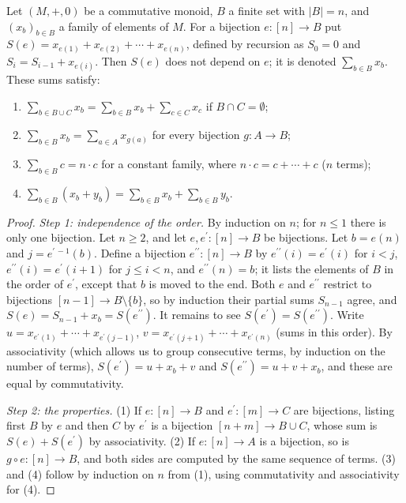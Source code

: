 \begin{lemma}\label{combinatorics:lemma-finite-sums}
Let $(M, +, 0)$ be a commutative monoid, $B$ a finite set with $|B| = n$, and $(x_b)_{b \in B}$ a family of elements of $M$. For a bijection $e \colon [n] \to B$ put
$S(e) = x_{e(1)} + x_{e(2)} + \cdots + x_{e(n)}$, defined by recursion as $S_0 = 0$ and $S_{i} = S_{i-1} + x_{e(i)}$. Then $S(e)$ does not depend on $e$; it is denoted $\sum_{b \in B}x_b$. These sums
satisfy:
\begin{enumerate}
\item $\sum_{b \in B \cup C}x_b = \sum_{b \in B}x_b + \sum_{c \in C}x_c$ if $B \cap C = \emptyset$;
\item $\sum_{b \in B}x_b = \sum_{a \in A}x_{g(a)}$ for every bijection $g \colon A \to B$;
\item $\sum_{b \in B}c = n \cdot c$ for a constant family, where $n \cdot c = c + \cdots + c$ ($n$ terms);
\item $\sum_{b \in B}(x_b + y_b) = \sum_{b \in B}x_b + \sum_{b \in B}y_b$.
\end{enumerate}
\end{lemma}

\begin{proof}
\emph{Step 1: independence of the order.} By induction on $n$; for $n \leq 1$ there is only one bijection. Let $n \geq 2$, and let $e, e^{\prime} \colon [n] \to B$ be bijections. Let
$b = e(n)$ and $j = e^{\prime\,-1}(b)$. Define a bijection $e^{\prime\prime} \colon [n] \to B$ by $e^{\prime\prime}(i) = e^{\prime}(i)$ for $i < j$, $e^{\prime\prime}(i) = e^{\prime}(i + 1)$ for
$j \leq i < n$, and $e^{\prime\prime}(n) = b$; it lists the elements of $B$ in the order of $e^{\prime}$, except that $b$ is moved to the end. Both $e$ and $e^{\prime\prime}$ restrict to bijections
$[n - 1] \to B \setminus \{b\}$, so by induction their partial sums $S_{n-1}$ agree, and $S(e) = S_{n-1} + x_b = S(e^{\prime\prime})$. It remains to see $S(e^{\prime}) = S(e^{\prime\prime})$.
Write $u = x_{e^{\prime}(1)} + \cdots + x_{e^{\prime}(j-1)}$, $v = x_{e^{\prime}(j+1)} + \cdots + x_{e^{\prime}(n)}$ (sums in this order). By associativity (which allows us to group consecutive terms,
by induction on the number of terms), $S(e^{\prime}) = u + x_b + v$ and $S(e^{\prime\prime}) = u + v + x_b$, and these are equal by commutativity.

\emph{Step 2: the properties.} (1) If $e \colon [n] \to B$ and $e^{\prime} \colon [m] \to C$ are bijections, listing first $B$ by $e$ and then $C$ by $e^{\prime}$ is a bijection
$[n + m] \to B \cup C$, whose sum is $S(e) + S(e^{\prime})$ by associativity. (2) If $e \colon [n] \to A$ is a bijection, so is $g \circ e \colon [n] \to B$, and both sides are computed by the same
sequence of terms. (3) and (4) follow by induction on $n$ from (1), using commutativity and associativity for (4).
\end{proof}

